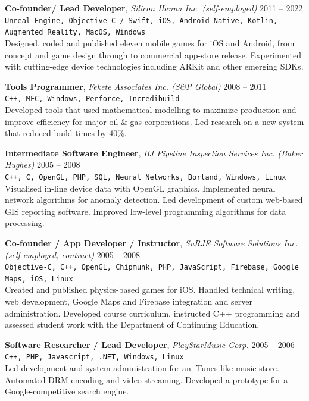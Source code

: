 \documentclass[10pt]{article}
\begin{document}
\textbf{Co-founder/ Lead Developer}, \textit{Silicon Hanna Inc. (self-employed)} \hfill 2011 -- 2022
\\\texttt{\small Unreal Engine, Objective-C / Swift, iOS, Android Native, Kotlin, Augmented Reality, MacOS, Windows}
\\[-2pt]
Designed, coded and published eleven mobile games for iOS and Android, from concept and game design through to commercial app-store release. Experimented with cutting-edge device technologies including ARKit and other emerging SDKs.


\textbf{Tools Programmer}, \textit{Fekete Associates Inc. (S\&P Global)} \hfill 2008 -- 2011
\\\texttt{\small C++, MFC, Windows, Perforce, Incredibuild}
\\[-2pt]
Developed tools that used mathematical modelling to maximize production and improve efficiency for major oil \& gas corporations. Led research on a new system that reduced build times by 40\%.


\textbf{Intermediate Software Engineer}, \textit{BJ Pipeline Inspection Services Inc. (Baker Hughes)} \hfill 2005 -- 2008
\\\texttt{\small C++, C, OpenGL, PHP, SQL, Neural Networks, Borland, Windows, Linux}
\\[-2pt]
Visualised in-line device data with OpenGL graphics. Implemented neural network algorithms for anomaly detection. Led development of custom web-based GIS reporting software. Improved low-level programming algorithms for data processing.


\textbf{Co-founder / App Developer / Instructor}, \textit{SuRJE Software Solutions Inc. (self-employed, contract)} \hfill 2005 -- 2008
\\\texttt{\small Objective-C, C++, OpenGL, Chipmunk, PHP, JavaScript, Firebase, Google Maps, iOS, Linux}
\\[-2pt]
Created and published physics-based games for iOS. Handled technical writing, web development, Google Maps and Firebase integration and server administration. Developed course curriculum, instructed C++ programming and assessed student work with the Department of Continuing Education.


\textbf{Software Researcher / Lead Developer}, \textit{PlayStarMusic Corp.} \hfill 2005 -- 2006
\\\texttt{\small C++, PHP, Javascript, .NET, Windows, Linux}
\\[-2pt]
Led development and system administration for an iTunes-like music store. Automated DRM encoding and video streaming. Developed a prototype for a Google-competitive search engine.
\end{document}
